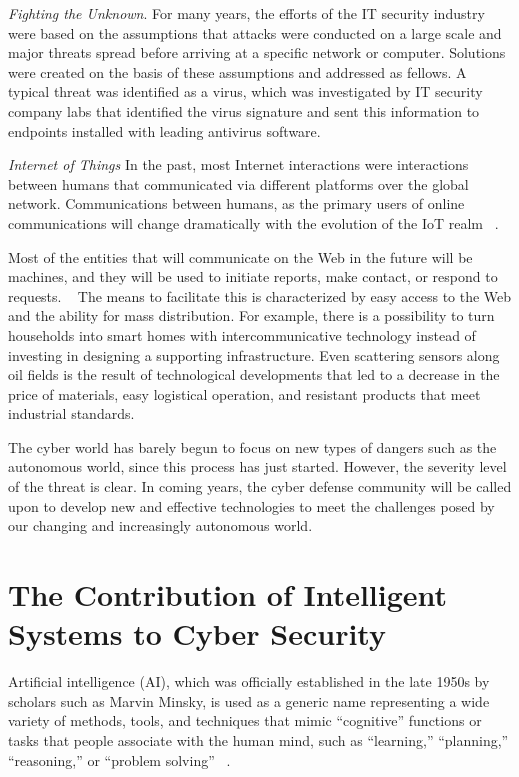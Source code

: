 \textit{Fighting the Unknown}. For many years, the efforts of the IT security industry were based on the assumptions 
that attacks were conducted on a large scale and major threats spread before arriving at a specific network or computer.
Solutions were created on the basis of these assumptions and addressed as fellows. A typical threat was identified as a virus, which was investigated 
by IT security company labs that identified the virus signature and sent this information to endpoints installed with leading antivirus software. 

\textit{Internet of Things} In the past, most Internet interactions were interactions between humans that communicated via different platforms over the global network. 
Communications between humans, as the primary users of online communications will change dramatically with the evolution of the IoT realm ~\cite{Ko:2016:STU:2909066.2835492}. 

Most of the entities that will communicate on the Web in the future will be machines, and they will be used to initiate 
reports, make contact, or respond to requests. ~\cite{Komninos:2012}
The means to facilitate this is characterized by easy access to the Web and the ability for mass distribution. For example, there is a possibility to turn households into smart homes with 
intercommunicative technology instead of investing in designing a supporting infrastructure. 
Even scattering sensors along oil fields is the result of technological developments that led to a decrease in 
the price of materials, easy logistical operation, and resistant products that meet industrial standards. ~\cite{Chen:2017:DAI:3046067.3046227}

The cyber world has barely begun to focus on new types of dangers such as the autonomous world, since this process has just started. However, the severity 
level of the threat is clear. In coming years, the cyber defense community will be called upon to develop 
new and effective technologies to meet the challenges posed by our changing and increasingly autonomous world.


\section{The Contribution of Intelligent Systems to Cyber Security}\label{sec:cont-intelligent-systems-cyber-security}

Artificial intelligence (AI), which was officially established in the late 1950s by scholars such as Marvin Minsky, is used as a generic name representing a wide variety of
methods, tools, and techniques that mimic “cognitive” functions or tasks that people
associate with the human mind, such as “learning,” “planning,” “reasoning,” or “problem solving” ~\cite{Russell:1995}.


